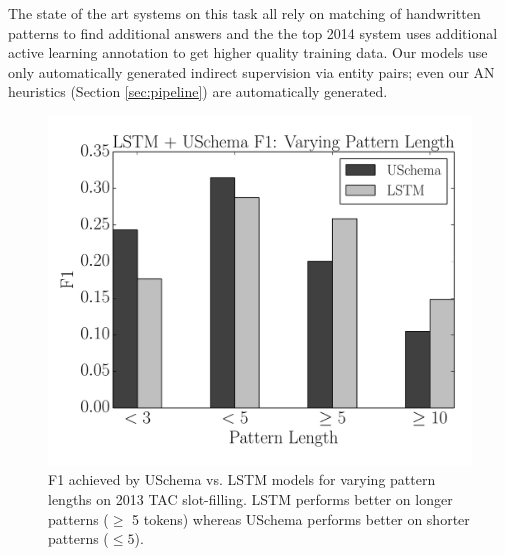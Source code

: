The state of the art systems on this task all rely on matching of handwritten patterns to find additional answers and the the top 2014 system uses additional active learning annotation to get higher quality training data. Our models use only automatically generated indirect supervision via entity pairs; even our AN heuristics (Section \ref{sec:pipeline}) are automatically generated.



\begin{figure}
\begin{center}
\includegraphics[scale=0.45]{f1-vary-pat-length}
\caption{F1 achieved by USchema vs. LSTM models for varying pattern lengths on 2013 TAC slot-filling. LSTM performs better on longer patterns ($\geq$ 5 tokens) whereas USchema performs better on shorter patterns ($\leq 5$). \label{fig:f1-vary-pats}}
\end{center}
\end{figure}

